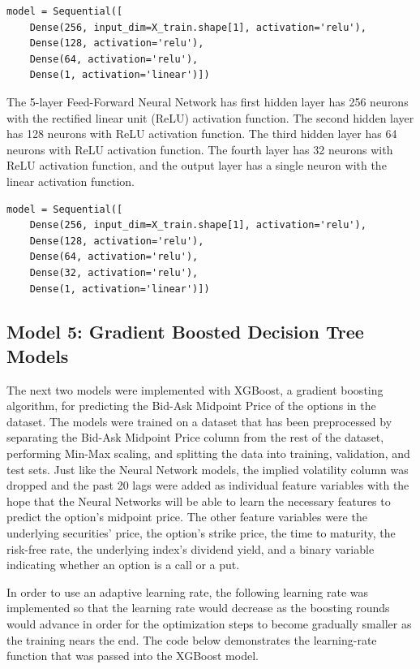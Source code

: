 \documentclass[a4paper]{article}
\begin{document}
\begin{lstlisting}[style=pythoncode, caption=4 Layer Feed-Forward Neural Network, label=lst:model_3]
model = Sequential([
    Dense(256, input_dim=X_train.shape[1], activation='relu'),
    Dense(128, activation='relu'),
    Dense(64, activation='relu'),
    Dense(1, activation='linear')])
\end{lstlisting}
The 5-layer Feed-Forward Neural Network has first hidden layer has 256 neurons with the rectified linear unit (ReLU) activation function. The second hidden layer has 128 neurons with ReLU activation function. The third hidden layer has 64 neurons with ReLU activation function. The fourth layer has 32 neurons with ReLU activation function, and the output layer has a single neuron with the linear activation function.
\begin{lstlisting}[style=pythoncode, caption=5 Layer Feed-Forward Neural Network, label=lst:model_4]
model = Sequential([
    Dense(256, input_dim=X_train.shape[1], activation='relu'),
    Dense(128, activation='relu'),
    Dense(64, activation='relu'),
    Dense(32, activation='relu'),
    Dense(1, activation='linear')])
\end{lstlisting}

\subsection{Model 5: Gradient Boosted Decision Tree Models}

The next two models were implemented with XGBoost, a gradient boosting algorithm, for predicting the Bid-Ask Midpoint Price of the options in the dataset. The models were trained on a dataset that has been preprocessed by separating the Bid-Ask Midpoint Price column from the rest of the dataset, performing Min-Max scaling, and splitting the data into training, validation, and test sets. Just like the Neural Network models, the implied volatility column was dropped and the past 20 lags were added as individual feature variables with the hope that the Neural Networks will be able to learn the necessary features to predict the option's midpoint price. The other feature variables were the underlying securities' price, the option's strike price, the time to maturity, the risk-free rate, the underlying index's dividend yield, and a binary variable indicating whether an option is a call or a put.

In order to use an adaptive learning rate, the following learning rate was implemented so that the learning rate would decrease as the boosting rounds would advance in order for the optimization steps to become gradually smaller as the training nears the end. The code below demonstrates the learning-rate function that was passed into the XGBoost model.
\end{document}
